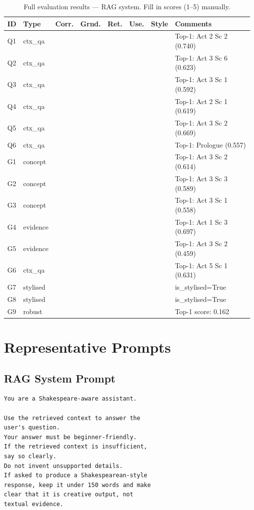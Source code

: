 \documentclass[10pt,conference]{IEEEtran}
\begin{document}
\begin{table}[h]
\centering
\caption{Full evaluation results --- RAG system. Fill in scores (1--5) manually.}
\label{tab:full-eval-rag}
\begin{tabularx}{\textwidth}{llp{1.5cm}p{1.2cm}p{1.2cm}p{1.2cm}p{1.2cm}X}
\toprule
ID & Type & Corr. & Grnd. & Ret. & Use. & Style & Comments \\
\midrule
Q1 & ctx\_qa & & & & & & Top-1: Act 2 Sc 2 (0.740) \\
Q2 & ctx\_qa & & & & & & Top-1: Act 3 Sc 6 (0.623) \\
Q3 & ctx\_qa & & & & & & Top-1: Act 3 Sc 1 (0.592) \\
Q4 & ctx\_qa & & & & & & Top-1: Act 2 Sc 1 (0.619) \\
Q5 & ctx\_qa & & & & & & Top-1: Act 3 Sc 2 (0.669) \\
Q6 & ctx\_qa & & & & & & Top-1: Prologue (0.557) \\
G1 & concept & & & & & & Top-1: Act 3 Sc 2 (0.614) \\
G2 & concept & & & & & & Top-1: Act 3 Sc 3 (0.589) \\
G3 & concept & & & & & & Top-1: Act 3 Sc 1 (0.558) \\
G4 & evidence & & & & & & Top-1: Act 1 Sc 3 (0.697) \\
G5 & evidence & & & & & & Top-1: Act 3 Sc 2 (0.459) \\
G6 & ctx\_qa & & & & & & Top-1: Act 5 Sc 1 (0.631) \\
G7 & stylised & & & & & & is\_stylised=True \\
G8 & stylised & & & & & & is\_stylised=True \\
G9 & robust & & & & & & Top-1 score: 0.162 \\
\bottomrule
\end{tabularx}
\end{table}

\clearpage
\section{Representative Prompts}
\label{app:prompts}

\subsection{RAG System Prompt}

\begin{lstlisting}[language={}]
You are a Shakespeare-aware assistant.

Use the retrieved context to answer the
user's question.
Your answer must be beginner-friendly.
If the retrieved context is insufficient,
say so clearly.
Do not invent unsupported details.
If asked to produce a Shakespearean-style
response, keep it under 150 words and make
clear that it is creative output, not
textual evidence.
\end{lstlisting}
\end{document}
